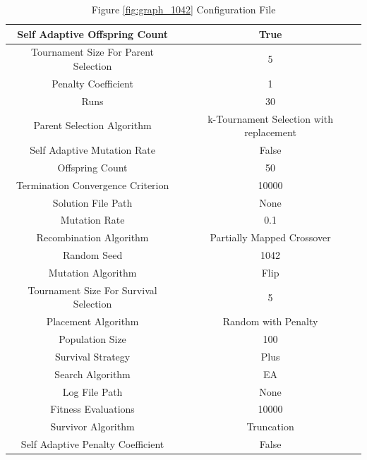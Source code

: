 \documentclass{standalone}
\begin{document}
\begin{table}[!htb]
	\centering
	\caption{Figure \ref{fig:graph_1042} Configuration File}
	\label{tab:graph_1042}
	\begin{tabular}{| c | c |}
		\hline
		Self Adaptive Offspring Count		& True		 \\
		\hline
		Tournament Size For Parent Selection		& 5		 \\
		\hline
		Penalty Coefficient		& 1		 \\
		\hline
		Runs		& 30		 \\
		\hline
		Parent Selection Algorithm		& k-Tournament Selection with replacement		 \\
		\hline
		Self Adaptive Mutation Rate		& False		 \\
		\hline
		Offspring Count		& 50		 \\
		\hline
		Termination Convergence Criterion		& 10000		 \\
		\hline
		Solution File Path		& None		 \\
		\hline
		Mutation Rate		& 0.1		 \\
		\hline
		Recombination Algorithm		& Partially Mapped Crossover		 \\
		\hline
		Random Seed		& 1042		 \\
		\hline
		Mutation Algorithm		& Flip		 \\
		\hline
		Tournament Size For Survival Selection		& 5		 \\
		\hline
		Placement Algorithm		& Random with Penalty		 \\
		\hline
		Population Size		& 100		 \\
		\hline
		Survival Strategy		& Plus		 \\
		\hline
		Search Algorithm		& EA		 \\
		\hline
		Log File Path		& None		 \\
		\hline
		Fitness Evaluations		& 10000		 \\
		\hline
		Survivor Algorithm		& Truncation		 \\
		\hline
		Self Adaptive Penalty Coefficient		& False		 \\
		\hline
	\end{tabular}
\end{table}
\end{document}
